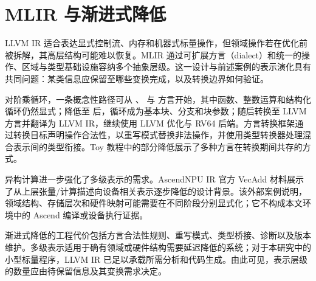 \section{MLIR 与渐进式降低}
\label{sec:mlir}

LLVM IR 适合表达显式控制流、内存和机器式标量操作，但领域操作若在优化前被拆解，其高层结构可能难以恢复。MLIR 通过可扩展方言（dialect）和统一的操作、区域与类型基础设施容纳多个抽象层级\cite{lattner-et-al-mlir-2021}。这一设计与前述案例的表示演化具有共同问题：某类信息应保留至哪些变换完成，以及转换边界如何验证。

对阶乘循环，一条概念性路径可从 、 与  方言开始，其中函数、整数运算和结构化循环仍然显式；降低至  后，循环成为基本块、分支和块参数；随后转换至 LLVM 方言并翻译为 LLVM IR，继续使用 LLVM 优化与 RV64 后端。方言转换框架通过转换目标声明操作合法性，以重写模式替换非法操作，并使用类型转换器处理混合表示间的类型衔接\cite{mlir-dialect-conversion-2026,mlir-llvm-target-2026}。Toy 教程中的部分降低展示了多种方言在转换期间共存的方式\cite{mlir-toy-lowering-2026}。

异构计算进一步强化了多级表示的需求。AscendNPU IR 官方 VecAdd 材料展示了从上层张量/计算描述向设备相关表示逐步降低的设计背景\cite{ascend-vecadd-2026,ascend-architecture-2026}。该外部案例说明，领域结构、存储层次和硬件映射可能需要在不同阶段分别显式化；它不构成本文环境中的 Ascend 编译或设备执行证据。

渐进式降低的工程代价包括方言合法性规则、重写模式、类型桥接、诊断以及版本维护。多级表示适用于确有领域或硬件结构需要延迟降低的系统；对于本研究中的小型标量程序，LLVM IR 已足以承载所需分析和代码生成。由此可见，表示层级的数量应由待保留信息及其变换需求决定。
